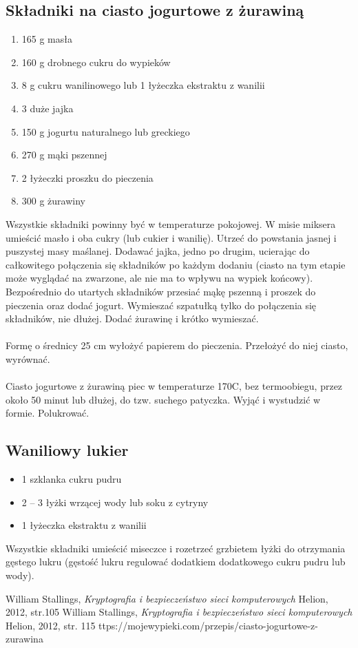 \documentclass[12pt, a4paper,titlepage]{article}
\begin{document}
\subsection*{Składniki na ciasto jogurtowe z żurawiną}
\begin{enumerate}
\item 165 g masła
\item 160 g drobnego cukru do wypieków
\item 8 g cukru wanilinowego lub 1 łyżeczka ekstraktu z wanilii
\item 3 duże jajka
\item 150 g jogurtu naturalnego lub greckiego
\item  270 g mąki pszennej
\item 2 łyżeczki proszku do pieczenia
\item 300 g żurawiny
\end{enumerate}
\justify Wszystkie składniki powinny być w temperaturze pokojowej.
\newline
\newline
W misie miksera umieścić masło i oba cukry (lub cukier i wanilię). Utrzeć do powstania
jasnej i puszystej masy maślanej. Dodawać jajka, jedno po drugim, ucierając do całkowitego połączenia się składników po każdym dodaniu (ciasto na tym etapie może wyglądać na
zwarzone, ale nie ma to wpływu na wypiek końcowy). Bezpośrednio do utartych składników
przesiać mąkę pszenną i proszek do pieczenia oraz dodać jogurt. Wymieszać szpatułką tylko
do połączenia się składników, nie dłużej. Dodać żurawinę i krótko wymieszać.
\\
\\ 
Formę o średnicy 25 cm wyłożyć papierem do pieczenia. Przełożyć do niej ciasto, wyrównać.
\\
\\
Ciasto jogurtowe z żurawiną piec w temperaturze 170\textdegree C, bez termoobiegu, przez około 50
minut lub dłużej, do tzw. suchego patyczka. Wyjąć i wystudzić w formie. Polukrować.
\subsection*{Waniliowy lukier}
\begin{itemize}
\item 1 szklanka cukru pudru
\item 2 – 3 łyżki wrzącej wody lub soku z cytryny
\item 1 łyżeczka ekstraktu z wanilii
\end{itemize}
Wszystkie składniki umieścić miseczce i rozetrzeć grzbietem łyżki do otrzymania gęstego
lukru (gęstość lukru regulować dodatkiem dodatkowego cukru pudru lub wody).
\newpage
\begin{thebibliography}{9}
William Stallings,
\textit{Kryptografia i bezpieczeństwo sieci komputerowych} Helion, 2012, str.105
William Stallings,
\textit{Kryptografia i bezpieczeństwo sieci komputerowych} Helion, 2012, str.
115
 ttps://mojewypieki.com/przepis/ciasto-jogurtowe-z-zurawina
\end{thebibliography}
\end{document}
